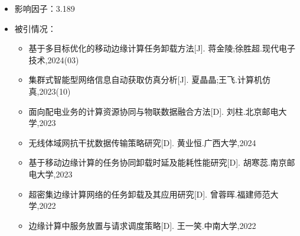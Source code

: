 \begin{itemize}
    \item 影响因子：3.189
    \item 被引情况：
        \begin{itemize}
            \item 基于多目标优化的移动边缘计算任务卸载方法[J]. 蒋金陵;徐胜超.现代电子技术,2024(03)
            \item 集群式智能型网络信息自动获取仿真分析[J]. 夏晶晶;王飞.计算机仿真,2023(10)
            \item 面向配电业务的计算资源协同与物联数据融合方法[D]. 刘柱.北京邮电大学,2023
            \item 无线体域网抗干扰数据传输策略研究[D]. 黄业恒.广西大学,2024
            \item 基于移动边缘计算的任务协同卸载时延及能耗性能研究[D]. 胡寒蕊.南京邮电大学,2023
            \item 超密集边缘计算网络的任务卸载及其应用研究[D]. 曾蓉晖.福建师范大学,2022
            \item 边缘计算中服务放置与请求调度策略[D]. 王一笑.中南大学,2022
        \end{itemize}
\end{itemize}
